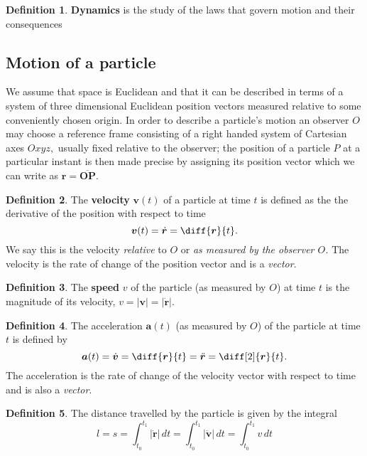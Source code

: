 \documentclass[12pt, a4paper]{article}
\theoremstyle{definition}
\newtheorem{definition}{Definition}[section]
\theoremstyle{plain}
\begin{document}
\begin{definition}
\textbf{Dynamics} is the study of the laws that govern motion and their consequences
\end{definition}

\subsection{Motion of a particle}

We assume that space is Euclidean and that it can be described in terms of a system of three dimensional Euclidean position vectors measured relative to some conveniently chosen origin. In order to describe a particle’s motion an observer $O$ may choose a reference frame consisting of a right handed system of Cartesian axes $Oxyz,$ usually fixed relative to the observer; the position of a particle $P$ at a particular instant is then made precise by assigning its position vector which we can write as $\bm{r = \overline{OP}}.$

\begin{definition}
The \textbf{velocity} $\bm{v}(t)$ of a particle at time $t$ is defined as the the derivative of the position with respect to time $$\bm{v}(t)=\dot{\bm{r}}=\diff{\bm{r}}{t}.$$ We say this is the velocity \textit{relative} to $O$ or \textit{as measured by the observer $O$.} The velocity is the rate of change of the position vector and is a \textit{vector}.
\end{definition}

\begin{definition}
The \textbf{speed} $v$ of the particle (as measured by $O$) at time $t$ is the magnitude of its velocity, $v = |\bm{v}| = |\dot{\bm{r}}|.$
\end{definition}

\begin{definition}
The acceleration $\bm{a}(t)$ (as measured by $O$) of the particle at time $t$ is defined by $$\bm{a}(t)=\dot{\bm{v}}=\diff{\bm{r}}{t}=\ddot{\bm{r}}=\diff[2]{\bm{r}}{t}.$$ The acceleration is the rate of change of the velocity vector with respect to time and is also a \textit{vector}.
\end{definition}

\begin{definition}
The distance travelled by the particle is given by the integral $$l=s=\int_{t_0}^{t_1}|\dot{\bm{r}}|\,dt=\int_{t_0}^{t_1}|\dot{\bm{v}}|\,dt=\int_{t_0}^{t_1}v\,dt$$
\end{definition}
\end{document}
